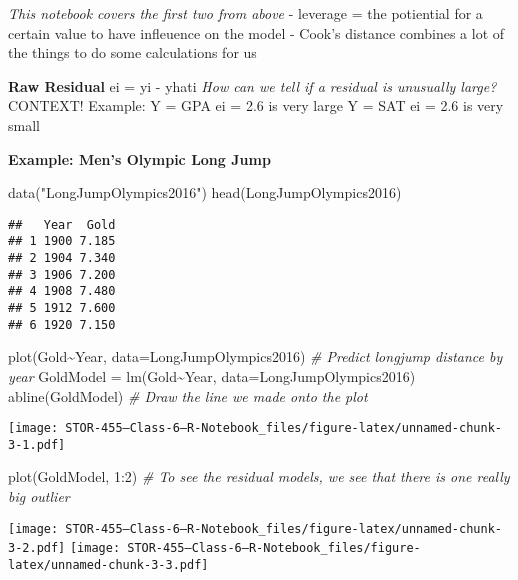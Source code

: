 \documentclass[
]{article}
\newenvironment{Shaded}{\begin{snugshade}}{\end{snugshade}}
\newcommand{\AttributeTok}[1]{\textcolor[rgb]{0.77,0.63,0.00}{#1}}
\newcommand{\CommentTok}[1]{\textcolor[rgb]{0.56,0.35,0.01}{\textit{#1}}}
\newcommand{\DecValTok}[1]{\textcolor[rgb]{0.00,0.00,0.81}{#1}}
\newcommand{\FunctionTok}[1]{\textcolor[rgb]{0.00,0.00,0.00}{#1}}
\newcommand{\NormalTok}[1]{#1}
\newcommand{\OtherTok}[1]{\textcolor[rgb]{0.56,0.35,0.01}{#1}}
\newcommand{\SpecialCharTok}[1]{\textcolor[rgb]{0.00,0.00,0.00}{#1}}
\newcommand{\StringTok}[1]{\textcolor[rgb]{0.31,0.60,0.02}{#1}}
\begin{document}
\emph{This notebook covers the first two from above} - leverage = the
potiential for a certain value to have infleuence on the model - Cook's
distance combines a lot of the things to do some calculations for us

\textbf{Raw Residual} ei = yi - yhati \emph{How can we tell if a
residual is unusually large? } CONTEXT! Example: Y = GPA ei = 2.6 is
very large Y = SAT ei = 2.6 is very small

\textbf{Example: Men's Olympic Long Jump}

\begin{Shaded}
\begin{Highlighting}[]
\FunctionTok{data}\NormalTok{(}\StringTok{"LongJumpOlympics2016"}\NormalTok{)}
\FunctionTok{head}\NormalTok{(LongJumpOlympics2016)}
\end{Highlighting}
\end{Shaded}

\begin{verbatim}
##   Year  Gold
## 1 1900 7.185
## 2 1904 7.340
## 3 1906 7.200
## 4 1908 7.480
## 5 1912 7.600
## 6 1920 7.150
\end{verbatim}

\begin{Shaded}
\begin{Highlighting}[]
\FunctionTok{plot}\NormalTok{(Gold}\SpecialCharTok{\textasciitilde{}}\NormalTok{Year, }\AttributeTok{data=}\NormalTok{LongJumpOlympics2016) }\CommentTok{\# Predict longjump distance by year }
\NormalTok{GoldModel }\OtherTok{=} \FunctionTok{lm}\NormalTok{(Gold}\SpecialCharTok{\textasciitilde{}}\NormalTok{Year, }\AttributeTok{data=}\NormalTok{LongJumpOlympics2016)}
\FunctionTok{abline}\NormalTok{(GoldModel) }\CommentTok{\# Draw the line we made onto the plot}
\end{Highlighting}
\end{Shaded}

\texttt{[image: STOR-455---Class-6---R-Notebook\_files/figure-latex/unnamed-chunk-3-1.pdf]}

\begin{Shaded}
\begin{Highlighting}[]
\FunctionTok{plot}\NormalTok{(GoldModel, }\DecValTok{1}\SpecialCharTok{:}\DecValTok{2}\NormalTok{) }\CommentTok{\# To see the residual models, we see that there is one really big outlier}
\end{Highlighting}
\end{Shaded}

\texttt{[image: STOR-455---Class-6---R-Notebook\_files/figure-latex/unnamed-chunk-3-2.pdf]}
\texttt{[image: STOR-455---Class-6---R-Notebook\_files/figure-latex/unnamed-chunk-3-3.pdf]}
\end{document}
